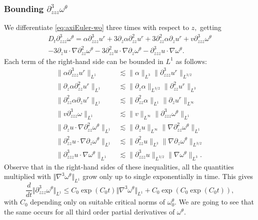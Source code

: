 \documentclass[11pt]{amsart}
\numberwithin{equation}{section}
\newcommand{\nrm}[1]{\Vert#1\Vert}
\def\d{\partial}
\newcommand{\nb}{\nabla}
\newcommand{\tht}{\theta}
\newcommand{\omg}{\omega}
\begin{document}
\subsubsection*{Bounding  $\d^3_{zzz}\omega^\theta$} We differentiate \eqref{eq:axiEuler-wo} three times with respect to $z,$ getting 
\begin{multline*}
D_t \d^3_{zzz}\omega^\theta = \alpha \d^3_{zzz}u^r+3 {\d_z\alpha} \d^2_{zz}u^r+ 3 \d^2_{zz}\alpha\d_{z}u^r + v\d^3_{zzz}\omega^\theta\\-3\d_zu\cdot\nabla\d^2_{zz}\omega^\theta
-3\d^2_{zz}u\cdot\nabla\d_{z}\omega^\theta-\d^3_{zzz}u\cdot\nabla\omega^\theta.
\end{multline*}
Each term of the right-hand side can be  bounded in $L^1$ as follows: 
\begin{align*}
\|\alpha\d^3_{zzz}u^r\|_{L^1}&\lesssim  \|\alpha\|_{L^3}\|\d^3_{zzz}u^r\|_{L^{3/2}}\\
\| \d_z\alpha\d^2_{zz}u^r\|_{L^1}&\lesssim  \|\d_z\alpha\|_{L^{3/2}}\| \d^2_{zz}u^r\|_{L^3}\\
 \| \d^2_{zz}\alpha\d_{z}u^r \|_{L^1}&\lesssim \|\d^2_{zz}\alpha\|_{L^1}  \| \d_{z}u^r\|_{L^\infty}\\
 \| v \d^3_{zzz}\omega\|_{L^1}&\lesssim  \| v\|_{L^\infty}\| \d^3_{zzz}\omega^\theta\|_{L^1}\\
 \|\d_zu\cdot\nabla\d^2_{zz}\omega^\theta\|_{L^{1}}  &\lesssim  \|\d_zu\|_{L^\infty}\|\nabla\d^2_{zz}\omega^\theta\|_{L^1}\\
\|\d^2_{zz}u\cdot\nabla\d_{z}\omega^\theta\|_{L^1}&\lesssim \|\d^2_{zz}u\|_{L^3}\|\nabla\d_{z}\omega^\theta\|_{L^{3/2}}\\
\|\d^3_{zzz}u\cdot\nabla\omega^\theta\|_{L^1}&\lesssim \|\d^3_{zzz}u\|_{L^{3/2}}
\|\nabla\omega^\theta\|_{L^3}.
\end{align*}
Observe that in the right-hand sides of these inequalities, all the quantities multiplied with $\nrm{\nb^3\omg^{\tht}}_{L^{1}}$ grow only up to single exponentially in time. This gives \begin{equation*}
		\frac{d}{dt} \nrm{ \d^3_{zzz}\omega^\theta }_{L^{1}} \le C_0 \exp(C_0t) \nrm{ \nb^{3}\omega^\theta }_{L^{1}}  + C_0 \exp( C_0 \exp (C_0t)), 
\end{equation*}
with $C_0$ depending only on suitable critical norms of $\omega_0^\theta.$
\smallbreak
 We are going to see that the same occurs for all  third order partial derivatives of $\omg^\tht$. 
\end{document}
